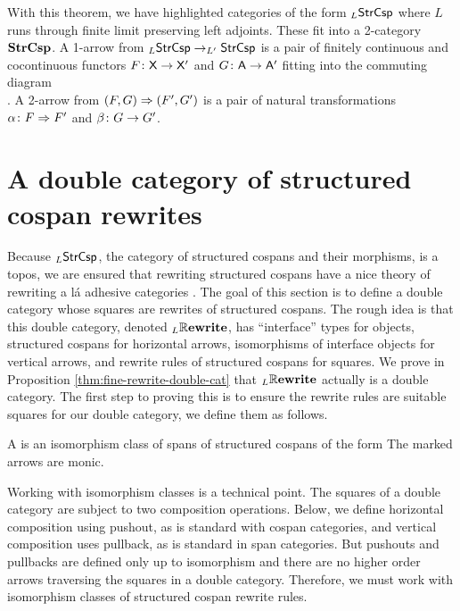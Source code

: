 \documentclass{amsart}
\begin{document}
With this theorem, we have highlighted categories of the
form $ _L\mathsf{StrCsp} $ where $ L $ runs through finite limit
preserving left adjoints. These  fit into a 2-category $ \mathbf{StrCsp} $. A 1-arrow
from $ _L\mathsf{StrCsp} \to _{L'}\mathsf{StrCsp} $ is a pair of finitely
continuous and cocontinuous functors $ F \colon \mathsf{X} \to \mathsf{X}' $
and $ G \colon \mathsf{A} \to \mathsf{A}' $ fitting into the commuting
diagram
$$  $$. A 2-arrow from $
(F,G) \Rightarrow (F',G') $ is a pair of natural transformations $
\alpha \colon F \Rightarrow F' $ and $ \beta \colon G \to G'$. 

\section{A double category of structured cospan rewrites}
\label{sec:DblCat}


Because $ _L\mathsf{StrCsp} $, the category of structured cospans
and their morphisms, is a topos, we are ensured that
rewriting structured cospans have a nice theory of rewriting
a l\'{a} adhesive categories \cite{LackSobo_Adhesive}.
The goal of this section is to define a double category whose squares
are rewrites of structured cospans.  The rough idea is
that this double category, denoted $ _L\mathbb{R}\mathbf{ewrite} $, has
``interface'' types for objects, structured cospans for
horizontal arrows, isomorphisms of interface objects for
vertical arrows, and rewrite rules of structured
cospans for squares. We prove in Proposition
\ref{thm:fine-rewrite-double-cat} that $ _L\mathbb{R}\mathbf{ewrite} $
actually is a double category. The first step to proving
this is to ensure the rewrite rules are suitable squares for
our double category, we define them as follows.

\begin{definition}[Rewrite]
  A  is an
  isomorphism class of spans of structured cospans of the
  form  The marked arrows are
  monic.
\end{definition}

Working with isomorphism classes is a technical point.  The
squares of a double category are subject to two composition
operations. Below, we define horizontal composition using
pushout, as is standard with cospan categories, and vertical
composition uses pullback, as is standard in span
categories.  But pushouts and pullbacks are defined only up
to isomorphism and there are no higher order arrows
traversing the squares in a double category. Therefore, we
must work with isomorphism classes of structured cospan
rewrite rules.
\end{document}
